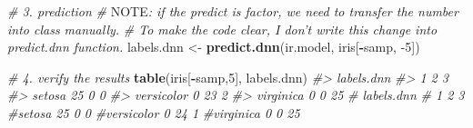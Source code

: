 \documentclass[]{book}
\newenvironment{Shaded}{\begin{snugshade}}{\end{snugshade}}
\newcommand{\AlertTok}[1]{\textcolor[rgb]{0.94,0.16,0.16}{#1}}
\newcommand{\CommentTok}[1]{\textcolor[rgb]{0.56,0.35,0.01}{\textit{#1}}}
\newcommand{\DecValTok}[1]{\textcolor[rgb]{0.00,0.00,0.81}{#1}}
\newcommand{\KeywordTok}[1]{\textcolor[rgb]{0.13,0.29,0.53}{\textbf{#1}}}
\newcommand{\NormalTok}[1]{#1}
\newcommand{\OperatorTok}[1]{\textcolor[rgb]{0.81,0.36,0.00}{\textbf{#1}}}
\newcommand{\StringTok}[1]{\textcolor[rgb]{0.31,0.60,0.02}{#1}}
\begin{document}
\begin{Shaded}
\begin{Highlighting}[]
\CommentTok{# 3. prediction}
\CommentTok{# }\AlertTok{NOTE}\CommentTok{: if the predict is factor, we need to transfer the number into class manually.}
\CommentTok{#       To make the code clear, I don't write this change into predict.dnn function.}
\NormalTok{labels.dnn <-}\StringTok{ }\KeywordTok{predict.dnn}\NormalTok{(ir.model, iris[}\OperatorTok{-}\NormalTok{samp, }\DecValTok{-5}\NormalTok{])}

\CommentTok{# 4. verify the results}
\KeywordTok{table}\NormalTok{(iris[}\OperatorTok{-}\NormalTok{samp,}\DecValTok{5}\NormalTok{], labels.dnn)}
\CommentTok{#>             labels.dnn}
\CommentTok{#>               1  2  3}
\CommentTok{#>   setosa     25  0  0}
\CommentTok{#>   versicolor  0 23  2}
\CommentTok{#>   virginica   0  0 25}
\CommentTok{#          labels.dnn}
\CommentTok{#            1  2  3}
\CommentTok{#setosa     25  0  0}
\CommentTok{#versicolor  0 24  1}
\CommentTok{#virginica   0  0 25}
\end{Highlighting}
\end{Shaded}
\end{document}
